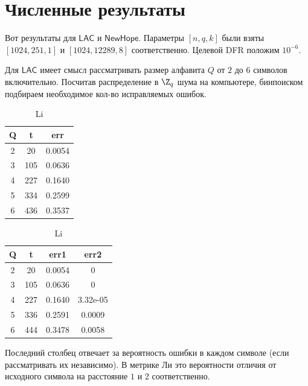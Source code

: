 \section{Численные результаты}
\label{sec:Chapter5} 

Вот результаты для $\mathsf{LAC}$ и $\mathsf{NewHope}$. Параметры $[n, q, k]$ были взяты $[1024, 251, 1]$ и $[1024, 12289, 8]$ соответственно. Целевой DFR положим $10^{-6}$.

Для $\mathsf{LAC}$ имеет смысл рассматривать размер алфавита $Q$ от $2$ до $6$ символов включительно. Посчитав распределение в $\Z_q$ шума на компьютере, бинпоиском подбираем необходимое кол-во исправляемых ошибок.

\begin{table}[h]
	\centering
	\begin{minipage}{0.48\textwidth}
		\centering
		\begin{tabular}{|c|c|c|}
			\hline Q & t & err \\ \hline
			2 & 20 & 0.0054 \\ \hline
			3 & 105 & 0.0636 \\ \hline
			4 & 227 & 0.1640 \\ \hline
			5 & 334 & 0.2599 \\ \hline
			6 & 436 & 0.3537 \\ \hline
		\end{tabular}
		\caption*{Hamming}
	\end{minipage}
	\begin{minipage}{0.48\textwidth}
		\centering
		\begin{tabular}{|c|c|c|c|}
			\hline Q & t & err1 & err2 \\ \hline
			2 & 20 & 0.0054 & 0 \\ \hline
			3 & 105 & 0.0636 & 0 \\ \hline
			4 & 227 & 0.1640 & 3.32e-05 \\ \hline
			5 & 336 & 0.2591 & 0.0009 \\ \hline
			6 & 444 & 0.3478 & 0.0058 \\ \hline
		\end{tabular}
		\caption*{Li}
	\end{minipage}
\end{table}

Последний столбец отвечает за вероятность ошибки в каждом символе (если рассматривать их независимо). В метрике Ли это вероятности отличия от исходного символа на расстояние $1$ и $2$ соответственно.

